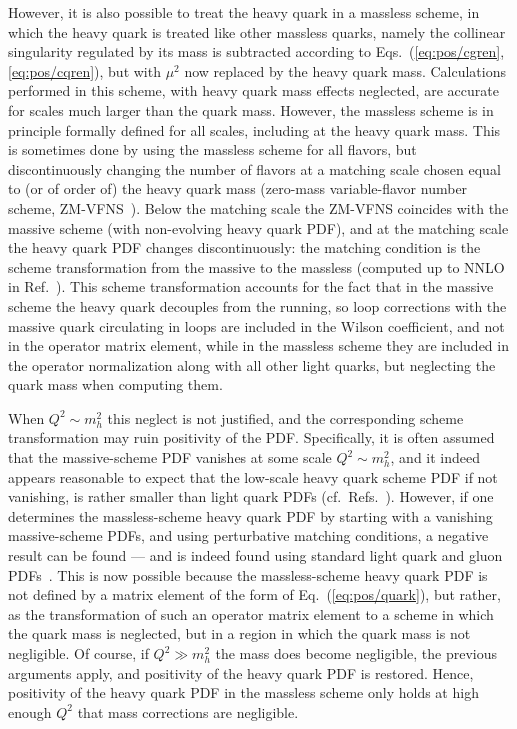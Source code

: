 However, it is also possible to treat the heavy quark in a massless \msbar{}
scheme, in which the heavy quark is treated like other massless
quarks, namely the collinear singularity regulated by its mass is
subtracted  according to Eqs.~(\ref{eq:pos/cgren},\ref{eq:pos/cqren}), but with
$\mu^2$ now replaced by the heavy quark mass. Calculations performed
in this scheme, with heavy quark mass effects neglected, are accurate
for scales much larger than the quark mass.  
However,  the massless scheme is in principle formally defined for all scales,
including at the heavy quark mass. This is sometimes done by using the
massless scheme for all flavors, but discontinuously changing the
number of flavors at a matching scale chosen equal to (or of order of) the
heavy quark mass (zero-mass variable-flavor number scheme,
ZM-VFNS~\cite{Aivazis:1993pi}). Below the matching scale the ZM-VFNS
coincides with the massive scheme (with non-evolving heavy quark PDF),
and at the matching scale the heavy quark PDF
changes discontinuously:  the matching condition is the scheme transformation
from the massive to the massless \msbar{} (computed up to NNLO in
Ref.~\cite{Buza:1996wv}). This scheme transformation accounts for the
fact that in the massive scheme the heavy quark decouples from the
running, so
loop corrections with the massive
quark circulating in loops are included in the Wilson coefficient,
and not in the operator matrix element, while in the massless scheme
they are included in the operator normalization along with all other
light quarks, but neglecting the quark mass when computing them.

When $Q^2\sim m_h^2$ this neglect is not justified, and the corresponding
scheme transformation may ruin positivity of the PDF. Specifically, it
is often assumed that the massive-scheme PDF vanishes at some scale  $Q^2\sim m_h^2$,
and it indeed appears
reasonable to expect that the low-scale heavy quark scheme PDF if not vanishing, is rather smaller than
light quark PDFs (cf.\
Refs.~\cite{Ball:2015dpa,Ball:2016neh}). However, if one determines the 
massless-scheme
heavy quark PDF by starting with a vanishing massive-scheme PDFs, and
using perturbative  matching conditions, a negative result can be found
--- and is 
indeed found using standard light quark and gluon
PDFs~\cite{Ball:2017nwa}. This is now possible because the
massless-scheme heavy quark
PDF is not defined by a matrix element of the form of
Eq.~(\ref{eq:pos/quark}), but rather, as the transformation of such an
operator matrix element to a scheme in which the quark mass is
neglected, but in a region in which the quark mass is not negligible.
Of course, if  $Q^2\gg m_h^2$ the mass does become negligible, the
previous arguments apply, and
positivity of the heavy quark PDF is restored. Hence, positivity of
the heavy quark PDF in the massless scheme only holds at high enough
$Q^2$ that mass corrections are negligible.
 
